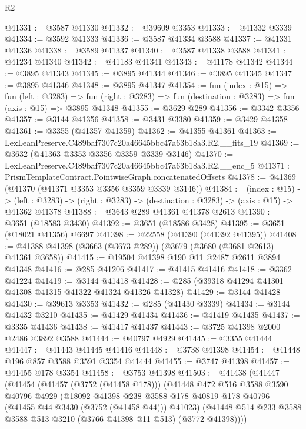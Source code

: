 \begin{lexlean}{R2}
\begin{coremodule}
@41331 := @3587 @41330
@41332 := @39609 @3353
@41333 := @41332 @3339
@41334 := @3592 @41333
@41336 := @3587 @41334 @3588
@41337 := @41331 @41336
@41338 := @3589 @41337
@41340 := @3587 @41338 @3588
@41341 := @41234 @41340
@41342 := @41183 @41341
@41343 := @41178 @41342
@41344 := @3895 @41343
@41345 := @3895 @41344
@41346 := @3895 @41345
@41347 := @3895 @41346
@41348 := @3895 @41347
@41354 := fun (index : @15) =>
  fun (left : @3283) =>
  fun (right : @3283) => fun (destination : @3283) => fun (axis : @15) => @3895 @41348
@41355 := @3629 @289
@41356 := @3342 @3356
@41357 := @3144 @41356
@41358 := @3431 @3380
@41359 := @3429 @41358
@41361 := @3355 (@41357 @41359)
@41362 := @41355 @41361
@41363 := LexLeanPreserve.C489baf7307c20a46645bbc47a63b18a3.R2.__fits_19
@41369 := @3632 (@41363 @3353 @3356 @3359 @3339 @3146)
@41370 := LexLeanPreserve.C489baf7307c20a46645bbc47a63b18a3.R2.__enc_5
@41371 := PrismTemplateContract.PointwiseGraph.concatenatedOffsets
@41378 := @41369 (@41370 (@41371 @3353 @3356 @3359 @3339 @3146))
@41384 := (index : @15) ->
  (left : @3283) -> (right : @3283) -> (destination : @3283) -> (axis : @15) -> @41362 @41378
@41388 := @3643 @289 @41361 @41378 @2613
@41390 := @3651 (@18583 @3430)
@41392 := @3651 (@18586 @3428)
@41395 := @3651 (@18021 @41356) @6697
@41398 := @22558 (@41390 (@41392 @41395))
@41408 := @41388 @41398 (@3663 (@3673 @289)) (@3679 (@3680 (@3681 @2613) @41361 @3658))
@41415 := @19504 @41398 @190 @11 @2487 @2611 @3894 @41348
@41416 := @285 @41206
@41417 := @41415 @41416
@41418 := @3362 @41224
@41419 := @3144 @41418
@41428 := @285 (@39318 @41294 @41301 @41308 @41315 @41322 @41324 @41326 @41328)
@41429 := @3144 @41428
@41430 := @39613 @3353
@41432 := @285 (@41430 @3339)
@41434 := @3144 @41432 @3210
@41435 := @41429 @41434
@41436 := @41419 @41435
@41437 := @3335 @41436
@41438 := @41417 @41437
@41443 := @3725 @41398 @2000 @2486 @3892 @3588
@41444 := @40797 @4929
@41445 := @3355 @41444
@41447 := @41443 @41445 @41416
@41448 := @3738 @41398
@41454 := @41448 @196 @857 @3588 @3591 @3354 @41444
@41455 := @3747 @41398
@41457 := @41455 @178 @3354
@41458 := @3753 @41398
@41503 := @41438
    (@41447
      (@41454
        (@41457 (@3752 (@41458 @178)))
        (@41448
          @472
          @516
          @3588
          @3590
          @40796
          @4929
          (@18092
            @41398
            @238
            @3588
            @178
            @40819
            @178
            @40796
            (@41455 @44 @3430 (@3752 (@41458 @44)))
            @41023)
          (@41448 @514 @233 @3588 @3588 @513 @3210 (@3766 @41398 @11 @513) (@3772 @41398))))

\end{coremodule}
\end{lexlean}
